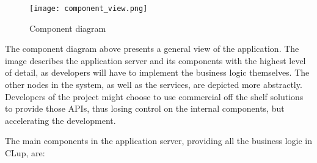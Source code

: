 \documentclass[../../main.tex]{subfiles}
\begin{document}
\begin{figure}[H]
    \centering
    \texttt{[image: component\_view.png]}
    \caption{
        Component diagram
    }
\end{figure}

The component diagram above presents a general view of the application. 
The image describes the application server and its components with the highest level of detail, 
as developers will have to implement the business logic themselves. The other nodes in the system, as well as the services, 
are depicted more abstractly. Developers of the project might choose to use commercial off the shelf solutions 
to provide those APIs, thus losing control on the internal components, but accelerating the development.


The main components in the application server, providing all the business logic in CLup, are:
\end{document}
